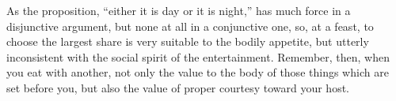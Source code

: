 As the proposition, ``either it is day or it is night,'' has much force in
a disjunctive argument, but none at all in a conjunctive one, so, at a
feast, to choose the largest share is very suitable to the bodily
appetite, but utterly inconsistent with the social spirit of the
entertainment. Remember, then, when you eat with another, not only the
value to the body of those things which are set before you, but also the
value of proper courtesy toward your host.
